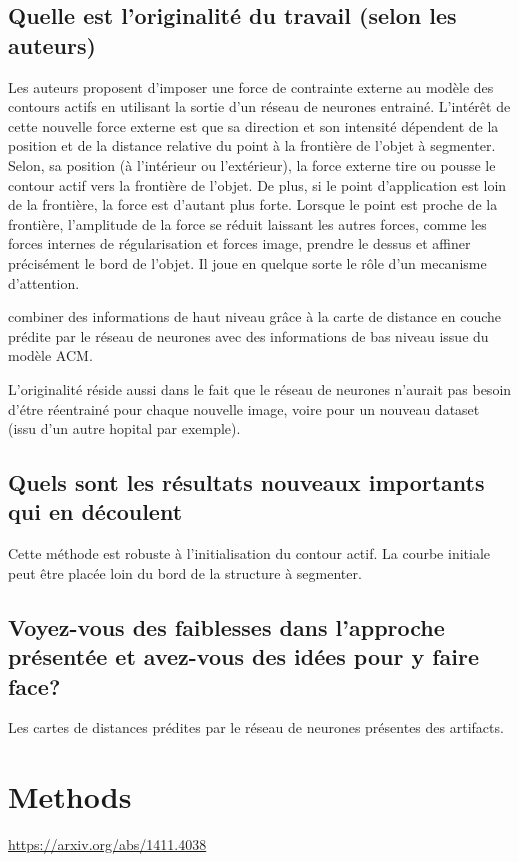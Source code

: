 \documentclass[a4paper, 11pt]{article}
\begin{document}
\subsection{Quelle est l'originalité du travail (selon les auteurs)}

Les auteurs proposent d'imposer une force de contrainte externe au modèle des contours actifs en utilisant la sortie d'un réseau de neurones entrainé. L'intérêt de cette nouvelle force externe est que sa direction et son intensité dépendent de la position et de la distance relative du point à la frontière de l'objet à segmenter. Selon, sa position (à l'intérieur ou l'extérieur), la force externe tire ou pousse le contour actif vers la frontière de l'objet. De plus, si le point d'application est loin de la frontière, la force est d'autant plus forte. Lorsque le point est proche de la frontière, l'amplitude de la force se réduit laissant les autres forces, comme les forces internes de régularisation et forces image, prendre le dessus et affiner précisément le bord de l'objet. Il joue en quelque sorte le rôle d'un mecanisme d'attention.

combiner des informations de haut niveau grâce à la carte de distance en couche prédite par le réseau de neurones avec des informations de bas niveau issue du modèle ACM. 

L'originalité réside aussi dans le fait que le réseau de neurones n'aurait pas besoin d'étre réentrainé pour chaque nouvelle image, voire pour un nouveau dataset (issu d'un autre hopital par exemple). 

\subsection{Quels sont les résultats nouveaux importants qui en découlent}

Cette méthode est robuste à l'initialisation du contour actif. La courbe initiale peut être placée loin du bord de la structure à segmenter. 

\subsection{Voyez-vous des faiblesses dans l'approche présentée et avez-vous des idées pour y faire face?}

Les cartes de distances prédites par le réseau de neurones présentes des artifacts. 


\section{Methods}
\url{https://arxiv.org/abs/1411.4038} 
\end{document}
